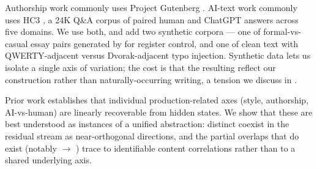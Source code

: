 Authorship work commonly uses Project Gutenberg \citep{sarfati2025prompt}. AI-text work commonly uses HC3 \citep{guo2023chatgpt}, a 24K Q\&A corpus of paired human and ChatGPT answers across five domains. We use both, and add two synthetic corpora --- one of formal-vs-casual essay pairs generated by \gptmini for register control, and one of clean text with QWERTY-adjacent versus Dvorak-adjacent typo injection. Synthetic data lets us isolate a single axis of variation; the cost is that the resulting \modes reflect our construction rather than naturally-occurring writing, a tension we discuss in .

 Prior work establishes that individual production-related axes (style, authorship, AI-vs-human) are linearly recoverable from hidden states. We show that these are best understood as instances of a unified \modes abstraction: distinct \modes coexist in the residual stream as near-orthogonal directions, and the partial overlaps that do exist (notably \register $\to$ \aihuman) trace to identifiable content correlations rather than to a shared underlying axis.
